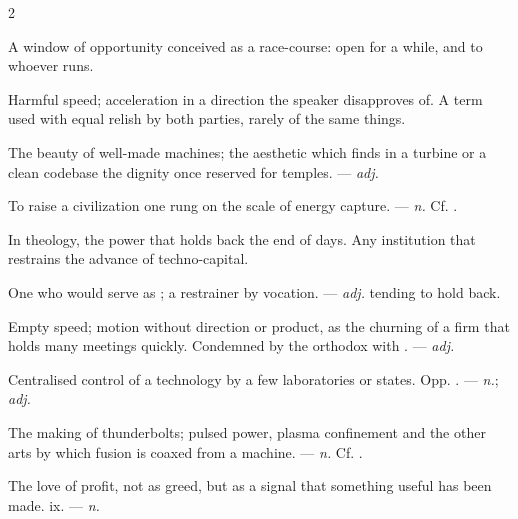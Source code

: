 \begin{multicols}{2}

 A window of opportunity conceived as a race-course: open for a while, and to whoever runs.  

 Harmful speed; acceleration in a direction the speaker disapproves of. A term used with equal relish by both parties, rarely of the same things.

 The beauty of well-made machines; the aesthetic which finds in a turbine or a clean codebase the dignity once reserved for temples. —  \textit{adj.}

 To raise a civilization one rung on the scale of energy capture. —  \textit{n.} Cf. .

  In theology, the power that holds back the end of days.   Any institution that restrains the advance of techno-capital.

 One who would serve as ; a restrainer by vocation. —  \textit{adj.} tending to hold back.

 Empty speed; motion without direction or product, as the churning of a firm that holds many meetings quickly. Condemned by the orthodox with . —  \textit{adj.}

 Centralised control of a technology by a few laboratories or states. Opp. . —  \textit{n.};  \textit{adj.}

 The making of thunderbolts; pulsed power, plasma confinement and the other arts by which fusion is coaxed from a machine. —  \textit{n.} Cf. .

 The love of profit, not as greed, but as a signal that something useful has been made.   ix. —  \textit{n.}


\end{multicols}
